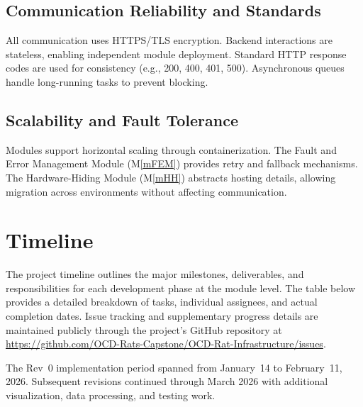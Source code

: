 \documentclass[12pt, titlepage]{article}
\newcommand{\mref}[1]{M\ref{#1}}
\begin{document}
\subsection{Communication Reliability and Standards}
All communication uses HTTPS/TLS encryption.  
Backend interactions are stateless, enabling independent module deployment.  
Standard HTTP response codes are used for consistency (e.g., 200, 400, 401, 500).  
Asynchronous queues handle long-running tasks to prevent blocking.

\subsection{Scalability and Fault Tolerance}
Modules support horizontal scaling through containerization.  
The Fault and Error Management Module (\mref{mFEM}) provides retry and fallback mechanisms.  
The Hardware-Hiding Module (\mref{mHH}) abstracts hosting details, allowing migration across environments without affecting communication.


\section{Timeline}

The project timeline outlines the major milestones, deliverables, and responsibilities for each development phase at the module level. The table below provides a detailed breakdown of tasks, individual assignees, and actual completion dates. Issue tracking and supplementary progress details are maintained publicly through the project's GitHub repository at \url{https://github.com/OCD-Rats-Capstone/OCD-Rat-Infrastructure/issues}.

The Rev~0 implementation period spanned from January~14 to February~11, 2026. Subsequent revisions continued through March 2026 with additional visualization, data processing, and testing work.
\end{document}

